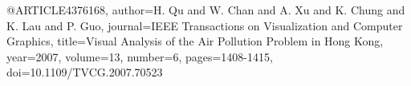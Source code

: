 @ARTICLE{4376168,
  author={H. {Qu} and W. {Chan} and A. {Xu} and K. {Chung} and K. {Lau} and P. {Guo}},
  journal={IEEE Transactions on Visualization and Computer Graphics}, 
  title={Visual Analysis of the Air Pollution Problem in Hong Kong}, 
  year={2007},
  volume={13},
  number={6},
  pages={1408-1415},
  doi={10.1109/TVCG.2007.70523}}